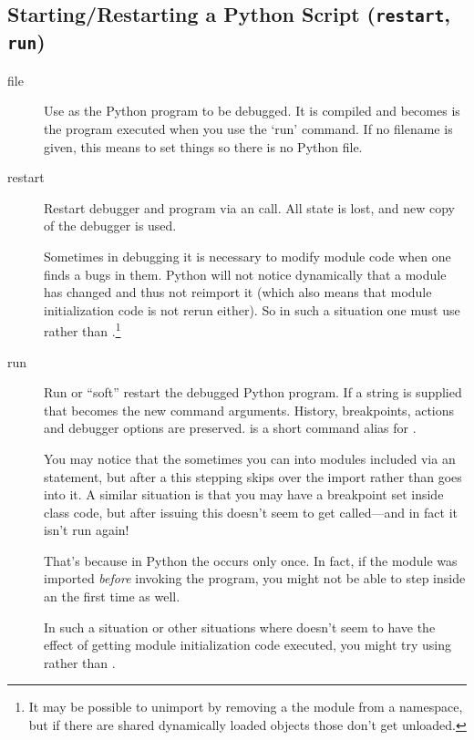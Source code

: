 \subsection{Starting/Restarting a Python Script ({\tt restart}, {\tt run})\label{subsection-restart}}

\begin{description}

\item[file \label{command:file}]

Use  as the Python program to be debugged.
It is compiled and becomes is the program executed when you use the `run'
command.  If no filename is given, this means to set things so there
is no Python file.

\item[restart ]\label{command:restart}

Restart debugger and program via an  call. All state
is lost, and new copy of the debugger is used.

Sometimes in debugging it is necessary to modify module code when one
finds a bugs in them. Python will not notice dynamically that a module
has changed and thus not reimport it (which also means that module
initialization code is not rerun either). So in such a situation one
must use  rather than .\footnote{It may be
possible to unimport by removing a the module from a namespace, but if
there are shared dynamically loaded objects those don't get unloaded.}

\item[run ]\label{command:run}

Run or ``soft'' restart the debugged Python program. If a string is
supplied that becomes the new command arguments.  History,
breakpoints, actions and debugger options are preserved.   is
a short command alias for . 

You may notice that the sometimes you can  into modules
included via an  statement, but after a  this
stepping skips over the import rather than goes into it. A similar
situation is that you may have a breakpoint set inside class
 code, but after issuing  this doesn't seem
to get called---and in fact it isn't run again!

That's because in Python the  occurs only once. In fact,
if the module was imported \emph{before\/} invoking the program, you
might not be able to step inside an  the first time as
well.

In such a situation or other situations where  doesn't seem
to have the effect of getting module initialization code executed,
you might try using  rather than .

\end{description}

